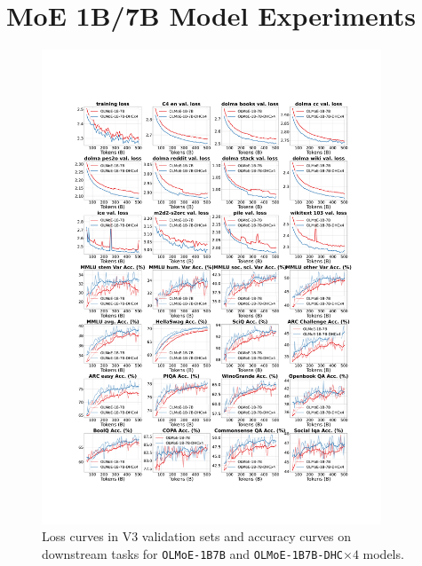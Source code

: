 \newpage
\section{MoE 1B/7B Model Experiments}
\begin{figure}[h]
    \begin{center}
    \includegraphics[width=0.9\textwidth]{fig/OLMoE_1B7B.pdf}
    \end{center}
  \caption{Loss curves in V3 validation sets and accuracy curves on downstream tasks for \texttt{OLMoE-1B7B} and \texttt{OLMoE-1B7B-DHC$\times{4}$} models.}
    \label{fig:moe_1b7b_full_results}
\end{figure}

\newpage
